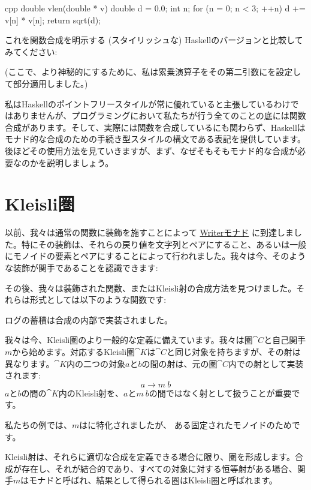 \begin{snip}{cpp}
double vlen(double * v) {
    double d = 0.0;
    int n;
    for (n = 0; n < 3; ++n)
        d += v[n] * v[n];
    return sqrt(d);
}
\end{snip}
これを関数合成を明示する (スタイリッシュな) Haskellのバージョンと比較してみてください: 

 (ここで、より神秘的にするために、私は累乗演算子\code{(\^{})}をその第二引数にを設定して部分適用しました。) 

私はHaskellのポイントフリースタイルが常に優れていると主張しているわけではありませんが、プログラミングにおいて私たちが行う全てのことの底には関数合成があります。そして、実際には関数を合成しているにも関わらず、Haskellはモナド的な合成のための手続き型スタイルの構文である表記を提供しています。後ほどその使用方法を見ていきますが、まず、なぜそもそもモナド的な合成が必要なのかを説明しましょう。

\section{Kleisli圏}

以前、我々は通常の関数に装飾を施すことによって
\hyperref[kleisli-categories]{Writerモナド}
に到達しました。特にその装飾は、それらの戻り値を文字列とペアにすること、あるいは一般にモノイドの要素とペアにすることによって行われました。我々は今、そのような装飾が関手であることを認識できます: 

その後、我々は装飾された関数、またはKleisli射の合成方法を見つけました。それらは形式としては以下のような関数です: 

ログの蓄積は合成の内部で実装されました。

我々は今、Kleisli圏のより一般的な定義に備えています。我々は圏$\cat{C}$と自己関手$m$から始めます。対応するKleisli圏$\cat{K}$は$\cat{C}$と同じ対象を持ちますが、その射は異なります。$\cat{K}$内の二つの対象$a$と$b$の間の射は、元の圏$\cat{C}$内での射として実装されます: 
\[a \to m\ b\]
$a$と$b$の間の$\cat{K}$内のKleisli射を、$a$と$m\ b$の間ではなく射として扱うことが重要です。

私たちの例では、$m$はに特化されましたが、
ある固定されたモノイドのためです。

Kleisli射は、それらに適切な合成を定義できる場合に限り、圏を形成します。合成が存在し、それが結合的であり、すべての対象に対する恒等射がある場合、関手$m$はモナドと呼ばれ、結果として得られる圏はKleisli圏と呼ばれます。

